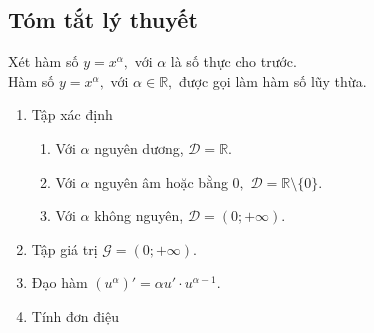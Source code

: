 \subsection{Tóm tắt lý thuyết}
\begin{dn}
	Xét hàm số $y=x^{\alpha},$ với $\alpha$ là số thực cho trước.\\
	Hàm số $y=x^{\alpha},$ với $\alpha\in\mathbb{R},$ được gọi làm hàm số lũy thừa.
\end{dn} 
\begin{enumerate}
	\item Tập xác định 
	\begin{enumerate}
		\item Với $\alpha$ nguyên dương, $\mathscr{D} = \mathbb{R}.$
		\item Với $\alpha$ nguyên âm hoặc bằng $0,$ $\mathscr{D} = \mathbb{R}\setminus\{0\}.$
		\item Với $\alpha$ không nguyên, $\mathscr{D}=(0;+\infty).$
	\end{enumerate}
	\item Tập giá trị $\mathscr{G} = (0;+\infty).$
	\item Đạo hàm $\left(u^{\alpha}\right)' = \alpha u' \cdot u^{\alpha-1}.$
	\item Tính đơn điệu 
\end{enumerate}	
